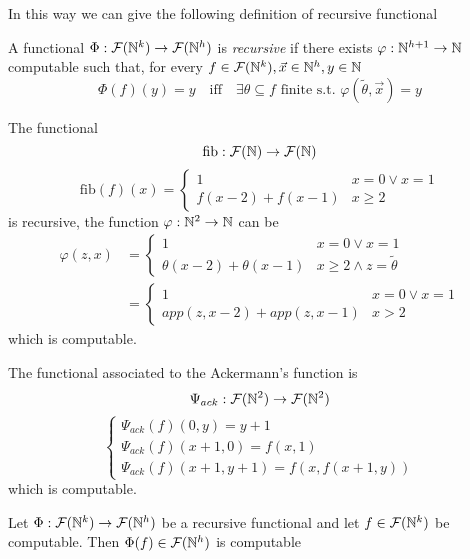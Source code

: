 In this way we can give the following definition of recursive functional
\begin{definition}
  A functional
  $\Phi : \mathcal{F}(\mathbb{N}^k) \to \mathcal{F}(\mathbb{N}^h)$ is
  \emph{recursive} if there exists $\varphi : \mathbb{N}^{h+1} \to \mathbb{N}$
  computable such that, for every
  $f \in \mathcal{F}(\mathbb{N}^k), \vec{x} \in \mathbb{N}^h,
  y \in \mathbb{N}$
  \[
    \Phi(f)(y) = y \quad \mbox{iff} \quad \exists \theta \subseteq f
    \mbox{ finite s.t. } \varphi(\tilde{\theta}, \vec{x}) = y
  \]
\end{definition}

\begin{example}
  The functional
  \newcommand{\fib}[1]{\ensuremath{\mbox{fib}(#1)}}
  \[
    \mbox{fib} : \mathcal{F}(\mathbb{N}) \to \mathcal{F}(\mathbb{N})
  \]
  \[
    \fib{f}(x) = \begin{cases}
      1 & x=0 \lor x=1 \\
      f(x-2) + f(x-1) & x \geq 2
    \end{cases}
  \]
  is recursive, the function $\varphi: \mathbb{N}^2 \to \mathbb{N}$ can be
  \[
    \begin{aligned}
      \varphi(z, x) &= \begin{cases}
        1 & x=0 \lor x=1 \\
        \theta(x-2) + \theta(x-1) & x \geq 2 \land z = \tilde{\theta}
      \end{cases} \\
      &= \begin{cases}
        1 & x = 0 \lor x = 1 \\
        app(z, x-2) + app(z, x-1) & x > 2
      \end{cases}
    \end{aligned}
  \]
  which is computable.
\end{example}

\begin{example}
The functional associated to the Ackermann's function is
\[
  \Psi_{ack} : \mathcal{F}(\mathbb{N}^2) \to \mathcal{F}(\mathbb{N}^2)
\]
\[
  \begin{cases}
    \Psi_{ack}(f)(0,y)   =  y+1 \\
    \Psi_{ack}(f)(x+1, 0)  =  f(x,1) \\
    \Psi_{ack}(f)(x+1, y+1)   =  f(x, f(x+1, y)) 
  \end{cases}
\]
which is computable.
\end{example}

\begin{theorem}\label{th:unknown}
  Let $\Phi : \mathcal{F}(\mathbb{N}^k) \to \mathcal{F}(\mathbb{N}^h)$
  be a recursive functional and let $f \in \mathcal{F}(\mathbb{N}^k)$ be
  computable. Then $\Phi(f) \in \mathcal{F}(\mathbb{N}^h)$ is computable
\end{theorem}

